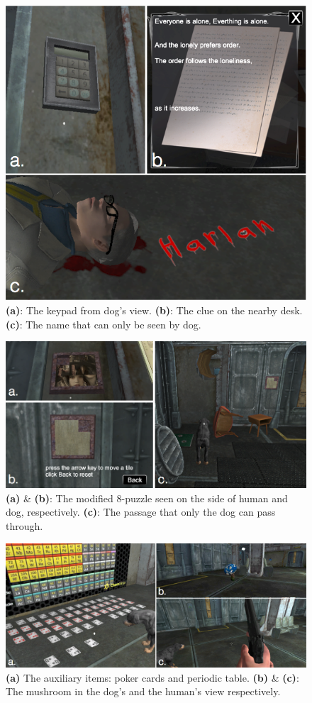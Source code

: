 \documentclass{sigchi}
\begin{document}
\begin{figure}[H]
\centering
\includegraphics[width=0.7\linewidth]{images/puzzle1_and_4.png}
\caption{\textbf{(a)}: The keypad from dog's view. \textbf{(b)}: The clue on the nearby desk. \textbf{(c)}: The name that can only be seen by dog.}
\label{fig:keypad_and_name}
\end{figure}

\begin{figure}[H]
\centering
\includegraphics[width=0.9\linewidth]{images/puzzle2_all.png}
\caption{\textbf{(a)} \& \textbf{(b)}: The modified 8-puzzle seen on the side of human and dog, respectively. \textbf{(c)}: The passage that only the dog can pass through.}
\label{fig:puzzle2_all}
\end{figure}

\begin{figure}[H]
\centering
\includegraphics[width=0.9\linewidth]{images/puzzle3_and_4.png}
\caption{\textbf{(a)} The auxiliary items: poker cards and periodic table. \textbf{(b)} \& \textbf{(c)}: The mushroom in the dog's and the human's view respectively.}
\label{fig:auxiliaryItems_and_mushrooms}
\end{figure}
\end{document}
